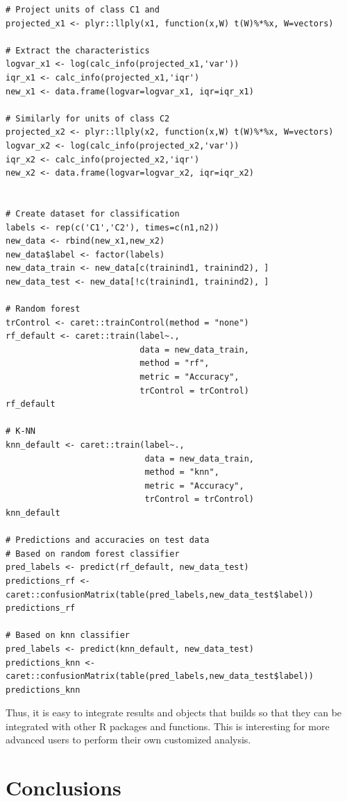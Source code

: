 \begin{verbatim}
# Project units of class C1 and 
projected_x1 <- plyr::llply(x1, function(x,W) t(W)%*%x, W=vectors)

# Extract the characteristics
logvar_x1 <- log(calc_info(projected_x1,'var'))
iqr_x1 <- calc_info(projected_x1,'iqr')
new_x1 <- data.frame(logvar=logvar_x1, iqr=iqr_x1)

# Similarly for units of class C2
projected_x2 <- plyr::llply(x2, function(x,W) t(W)%*%x, W=vectors)
logvar_x2 <- log(calc_info(projected_x2,'var'))
iqr_x2 <- calc_info(projected_x2,'iqr')
new_x2 <- data.frame(logvar=logvar_x2, iqr=iqr_x2)


# Create dataset for classification
labels <- rep(c('C1','C2'), times=c(n1,n2))
new_data <- rbind(new_x1,new_x2)
new_data$label <- factor(labels)
new_data_train <- new_data[c(trainind1, trainind2), ]
new_data_test <- new_data[!c(trainind1, trainind2), ]

# Random forest
trControl <- caret::trainControl(method = "none")
rf_default <- caret::train(label~.,
                           data = new_data_train,
                           method = "rf",
                           metric = "Accuracy",
                           trControl = trControl)
rf_default

# K-NN
knn_default <- caret::train(label~.,
                            data = new_data_train,
                            method = "knn",
                            metric = "Accuracy",
                            trControl = trControl)
knn_default

# Predictions and accuracies on test data
# Based on random forest classifier
pred_labels <- predict(rf_default, new_data_test)
predictions_rf <- caret::confusionMatrix(table(pred_labels,new_data_test$label))
predictions_rf

# Based on knn classifier
pred_labels <- predict(knn_default, new_data_test)
predictions_knn <- caret::confusionMatrix(table(pred_labels,new_data_test$label))
predictions_knn
\end{verbatim}

Thus, it is easy to integrate results and objects that  builds so that they can be integrated with other R packages and functions. This is interesting for more advanced users to perform  their own customized analysis.


\section{Conclusions}

